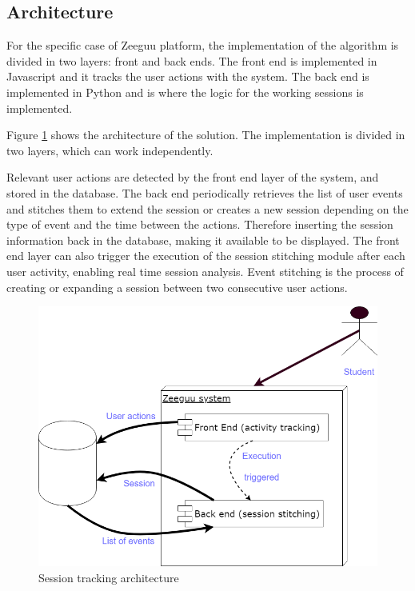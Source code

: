 \subsection{Architecture}
For the specific case of Zeeguu platform, the implementation of the algorithm is divided in two layers: front and back ends. The front end is implemented in Javascript and it tracks the user actions with the system. The back end is implemented in Python and is where the logic for the working sessions is implemented.

Figure \ref{fig:session_tracking_architecture} shows the architecture of the solution. The implementation is divided in two layers, which can work independently. 

Relevant user actions are detected by the front end layer of the system, and stored in the database. The back end periodically retrieves the list of user events and stitches them to extend the session or creates a new session depending on the type of event and the time between the actions. Therefore inserting the session information back in the database, making it available to be displayed.
The front end layer can also trigger the execution of the session stitching module after each user activity, enabling real time session analysis.
Event stitching is the process of creating or expanding a session between two consecutive user actions.

\begin{figure}[bth]
	\centering
	\includegraphics[width=0.7\linewidth]{gfx/session_tracking_architecture}
	\caption{Session tracking architecture}\label{fig:session_tracking_architecture}
\end{figure}

